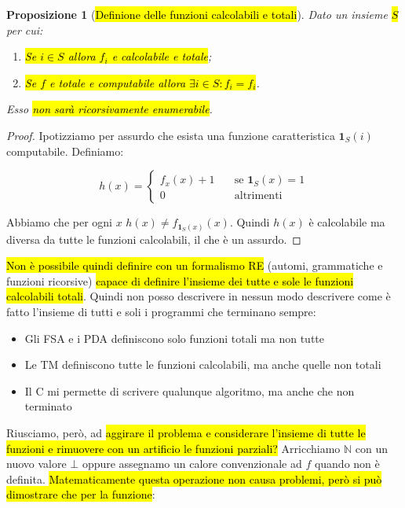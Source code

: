 \documentclass[a4paper,11pt,oneside]{article}
\theoremstyle{plain}
\newtheorem{prop}{Proposizione}[section]
\theoremstyle{definition}
\theoremstyle{remark}
\begin{document}
\begin{prop}[\hl{Definione delle funzioni calcolabili e totali}]\label{thm:def-func-tot}
  Dato un insieme \hl{$S$} per cui:

  \begin{enumerate}
    \item \hl{Se $i \in S$ allora $f_i$ e calcolabile e totale};
    \item \hl{Se $f$ e totale e computabile allora $\exists i \in S : f_i =
      f_i$}.
  \end{enumerate}

  Esso \hl{non sarà ricorsivamente enumerabile}.
\end{prop}
\begin{proof}
  Ipotizziamo per assurdo che esista una funzione caratteristica
  $\mathbf{1}_S(i)$ computabile. Definiamo:

  \[
    h(x) =
    \begin{cases}
      f_x(x) + 1 & \quad \text{se } \mathbf{1}_S(x) = 1 \\
      0          & \quad \text{altrimenti}
    \end{cases}
  \]

  Abbiamo che per ogni $x$ $h(x) \neq f_{\mathbf{1}_S(x)}(x)$. Quindi $h(x)$ è
  calcolabile ma diversa da tutte le funzioni calcolabili, il che è un assurdo.
\end{proof}

\hl{Non è possibile quindi definire con un formalismo RE} (automi, grammatiche e
funzioni ricorsive) \hl{capace di definire l'insieme dei tutte e sole le
funzioni calcolabili totali}. Quindi non posso descrivere in nessun modo
descrivere come è fatto l'insieme di tutti e soli i programmi che terminano
sempre:

\begin{itemize}
  \item Gli FSA e i PDA definiscono solo funzioni totali ma non tutte
  \item Le TM definiscono tutte le funzioni calcolabili, ma anche quelle non
    totali
  \item Il C mi permette di scrivere qualunque algoritmo, ma anche che non
    terminato
\end{itemize}

Riusciamo, però, ad \hl{aggirare il problema e considerare l'insieme di tutte le
funzioni e rimuovere con un artificio le funzioni parziali?} Arricchiamo
$\mathbb{N}$ con un nuovo valore $\bot$ oppure assegnamo un calore convenzionale
ad $f$ quando non è definita. \hl{Matematicamente questa operazione non causa
problemi, però si può dimostrare che per la funzione}:
\end{document}
